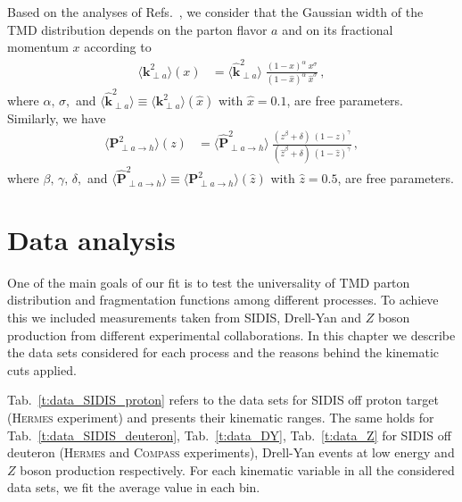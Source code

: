 \documentclass[aps,preprintnumbers,showpacs,nofootinbib,superscriptaddress,floatfix]{revtex4}
\newcommand{\hermes}{\textsc{Hermes }}
\newcommand{\compass}{\textsc{Compass }}
\newcommand{\T}{\perp}
\begin{document}
Based on the analyses of Refs.~\cite{Signori:2013mda,Bacchetta:2015ora}, we
consider that the
Gaussian width of the TMD distribution depends 
on the parton flavor $a$ and on its fractional momentum $x$ according to
\begin{align} 
\big\langle \bm{k}_{\T a}^2 \big\rangle (x) &= \big\langle \hat{\bm{k}}_{\T a}^2 \big\rangle \;  
\frac{(1-x)^{\alpha} \  x^{\sigma} }{ (1 - \hat{x})^{\alpha} \  \hat{x}^{\sigma} } \, ,
\label{e:kT2_kin}
\end{align}
where $\alpha, \, \sigma,$ and $\big\langle \hat{\bm{k}}_{\T a}^2 \big\rangle \equiv \big\langle \bm{k}_{\T a}^2 \big\rangle (\hat{x})$ with $\hat{x} = 0.1$, are free parameters. Similarly, we have
\begin{align}  
\big\langle \bm{P}_{\T a \to h}^2 \big\rangle (z) &= \big\langle \hat{\bm{P}}_{\T a \to h}^2 \big\rangle \  
               \frac{ (z^{\beta} + \delta)\ (1-z)^{\gamma} }{ (\hat{z}^{\beta} + \delta)\   (1 - \hat{z})^{\gamma} } \, ,
 \label{e:PT2_kin}
 \end{align}
where $\beta, \, \gamma, \, \delta, $ and $\big\langle \hat{\bm{P}}_{\T a \to
  h}^2 \big\rangle \equiv \big \langle \bm{P}_{\T a \to h}^2 \big\rangle
(\hat{z})$ with $\hat{z} = 0.5$, are free parameters. 

%




\newpage
\section{Data analysis}
\label{s:data_analysis}

One of the main goals of our fit is to test the universality of TMD parton distribution and fragmentation functions among different processes.
To achieve this we included measurements taken from SIDIS, Drell-Yan and $Z$ boson production from different experimental collaborations. 
In this chapter we describe the data sets considered for each process and the reasons behind the kinematic cuts applied.

Tab.~\ref{t:data_SIDIS_proton} refers to the data sets for SIDIS off proton target (\hermes experiment) and presents their kinematic ranges. 
The same holds for Tab.~\ref{t:data_SIDIS_deuteron}, Tab.~\ref{t:data_DY}, Tab.~\ref{t:data_Z} for SIDIS off deuteron (\hermes and \compass experiments), Drell-Yan events at low energy and $Z$ boson production respectively. 
For each kinematic variable in all the considered data sets, we fit the average value in each bin. 
\end{document}
